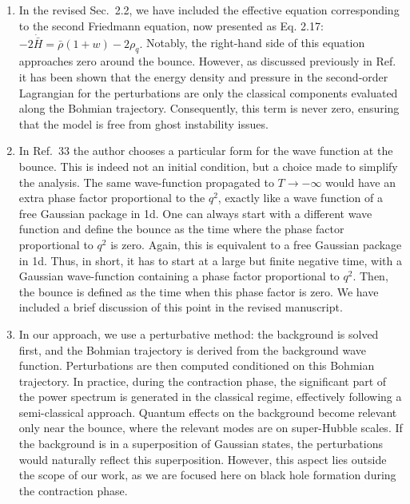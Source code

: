 \documentclass[a4paper,11pt]{article}
\begin{document}
\begin{enumerate}
\begin{enumerate}
                  \item In the revised Sec.~2.2, we have included the effective equation
                        corresponding to the second Friedmann equation, now presented as Eq. 2.17:
                        $-2\dot{\bar{H}} = \bar{\rho}(1+w) - 2\rho_q.$
                        Notably, the right-hand side of this equation approaches zero around the
                        bounce. However, as discussed previously in Ref.~\cite{fluidgeral} it
                        has been shown that the energy density and pressure in the second-order
                        Lagrangian for the perturbations are only the classical components
                        evaluated along the Bohmian trajectory. Consequently, this term is never
                        zero, ensuring that the model is free from ghost instability issues.
                  \item In Ref.~33 the author chooses a particular form for the wave
                        function at the bounce. This is indeed not an initial condition, but
                        a choice made to simplify the analysis. The same wave-function
                        propagated to $T\to-\infty$ would have an extra phase factor
                        proportional to the $q^2$, exactly like a wave function of a
                        free Gaussian package in 1d. One can always start with a different
                        wave function and define the bounce as the time where the phase
                        factor proportional to $q^2$ is zero. Again, this is equivalent to a
                        free Gaussian package in 1d. Thus, in short, it has to start at a large
                        but finite negative time, with a Gaussian wave-function containing a
                        phase factor proportional to $q^2$. Then, the bounce is defined as
                        the time when this phase factor is zero. We have included a brief
                        discussion of this point in the revised manuscript.
                  \item In our approach, we use a perturbative method: the background is
                        solved first, and the Bohmian trajectory is derived from the
                        background wave function. Perturbations are then computed
                        conditioned on this Bohmian trajectory. In practice, during the
                        contraction phase, the significant part of the power spectrum is
                        generated in the classical regime, effectively following a
                        semi-classical approach. Quantum effects on the background become
                        relevant only near the bounce, where the relevant modes are on
                        super-Hubble scales. If the background is in a superposition of
                        Gaussian states, the perturbations would naturally reflect this
                        superposition. However, this aspect lies outside the scope of our
                        work, as we are focused here on black hole formation during the
                        contraction phase.


\end{enumerate}
\end{enumerate}
\end{document}
